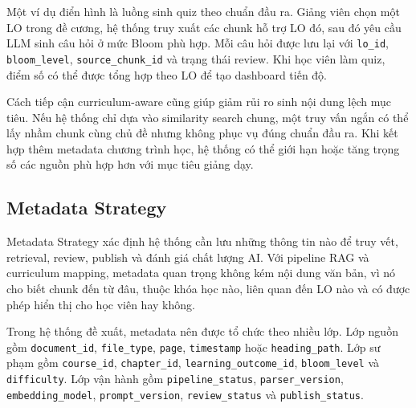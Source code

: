 Một ví dụ điển hình là luồng sinh quiz theo chuẩn đầu ra. Giảng viên chọn một LO
trong đề cương, hệ thống truy xuất các chunk hỗ trợ LO đó, sau đó yêu cầu LLM
sinh câu hỏi ở mức Bloom phù hợp. Mỗi câu hỏi được lưu lại với \texttt{lo\_id},
\texttt{bloom\_level}, \texttt{source\_chunk\_id} và trạng thái review. Khi học
viên làm quiz, điểm số có thể được tổng hợp theo LO để tạo dashboard tiến độ.

Cách tiếp cận curriculum-aware cũng giúp giảm rủi ro sinh nội dung lệch mục tiêu.
Nếu hệ thống chỉ dựa vào similarity search chung, một truy vấn ngắn có thể lấy
nhầm chunk cùng chủ đề nhưng không phục vụ đúng chuẩn đầu ra. Khi kết hợp thêm
metadata chương trình học, hệ thống có thể giới hạn hoặc tăng trọng số các nguồn
phù hợp hơn với mục tiêu giảng dạy.

\subsection{Metadata Strategy}
\label{subsec:metadata-strategy}

Metadata Strategy xác định hệ thống cần lưu những thông tin nào để truy vết,
retrieval, review, publish và đánh giá chất lượng AI. Với pipeline RAG và
curriculum mapping, metadata quan trọng không kém nội dung văn bản, vì nó cho
biết chunk đến từ đâu, thuộc khóa học nào, liên quan đến LO nào và có được phép
hiển thị cho học viên hay không.

Trong hệ thống đề xuất, metadata nên được tổ chức theo nhiều lớp. Lớp nguồn gồm
\texttt{document\_id}, \texttt{file\_type}, \texttt{page}, \texttt{timestamp}
hoặc \texttt{heading\_path}. Lớp sư phạm gồm \texttt{course\_id},
\texttt{chapter\_id}, \texttt{learning\_outcome\_id}, \texttt{bloom\_level} và
\texttt{difficulty}. Lớp vận hành gồm \texttt{pipeline\_status},
\texttt{parser\_version}, \texttt{embedding\_model}, \texttt{prompt\_version},
\texttt{review\_status} và \texttt{publish\_status}.

